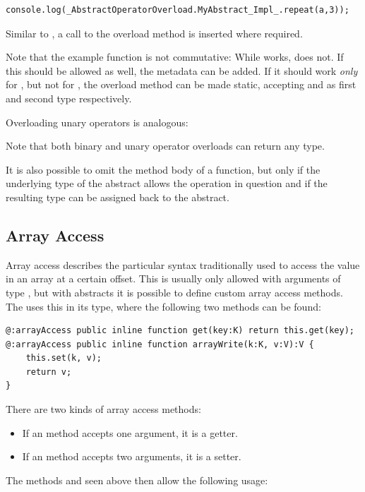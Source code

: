 \documentclass{haxe}
\begin{document}
\begin{lstlisting}
console.log(_AbstractOperatorOverload.MyAbstract_Impl_.repeat(a,3));
\end{lstlisting}
Similar to , a call to the overload method is inserted where required.

Note that the example  function is not commutative: While  works,  does not. If this should be allowed as well, the  metadata can be added. If it should work \emph{only} for , but not for , the overload method can be made static, accepting  and  as first and second type respectively.

Overloading unary operators is analogous:

Note that both binary and unary operator overloads can return any type.

It is also possible to omit the method body of a  function, but only if the underlying type of the abstract allows the operation in question and if the resulting type can be assigned back to the abstract.


\subsection{Array Access}
\label{types-abstract-array-access}

Array access describes the particular syntax traditionally used to access the value in an array at a certain offset. This is usually only allowed with arguments of type , but with abstracts it is possible to define custom array access methods. The  uses this in its  type, where the following two methods can be found:

\begin{lstlisting}
@:arrayAccess public inline function get(key:K) return this.get(key);
@:arrayAccess public inline function arrayWrite(k:K, v:V):V {
	this.set(k, v);
	return v;
}
\end{lstlisting}
There are two kinds of array access methods:

\begin{itemize}
	\item If an  method accepts one argument, it is a getter.
	\item If an  method accepts two arguments, it is a setter.
\end{itemize}
The methods  and  seen above then allow the following usage:
\end{document}
